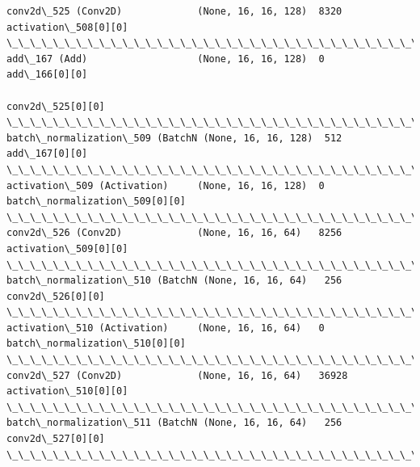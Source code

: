 \documentclass[11pt]{article}
\begin{document}
\begin{Verbatim}[commandchars=\\\{\}]
conv2d\_525 (Conv2D)             (None, 16, 16, 128)  8320        activation\_508[0][0]             
\_\_\_\_\_\_\_\_\_\_\_\_\_\_\_\_\_\_\_\_\_\_\_\_\_\_\_\_\_\_\_\_\_\_\_\_\_\_\_\_\_\_\_\_\_\_\_\_\_\_\_\_\_\_\_\_\_\_\_\_\_\_\_\_\_\_\_\_\_\_\_\_\_\_\_\_\_\_\_\_\_\_\_\_\_\_\_\_\_\_\_\_\_\_\_\_\_\_
add\_167 (Add)                   (None, 16, 16, 128)  0           add\_166[0][0]                    
                                                                 conv2d\_525[0][0]                 
\_\_\_\_\_\_\_\_\_\_\_\_\_\_\_\_\_\_\_\_\_\_\_\_\_\_\_\_\_\_\_\_\_\_\_\_\_\_\_\_\_\_\_\_\_\_\_\_\_\_\_\_\_\_\_\_\_\_\_\_\_\_\_\_\_\_\_\_\_\_\_\_\_\_\_\_\_\_\_\_\_\_\_\_\_\_\_\_\_\_\_\_\_\_\_\_\_\_
batch\_normalization\_509 (BatchN (None, 16, 16, 128)  512         add\_167[0][0]                    
\_\_\_\_\_\_\_\_\_\_\_\_\_\_\_\_\_\_\_\_\_\_\_\_\_\_\_\_\_\_\_\_\_\_\_\_\_\_\_\_\_\_\_\_\_\_\_\_\_\_\_\_\_\_\_\_\_\_\_\_\_\_\_\_\_\_\_\_\_\_\_\_\_\_\_\_\_\_\_\_\_\_\_\_\_\_\_\_\_\_\_\_\_\_\_\_\_\_
activation\_509 (Activation)     (None, 16, 16, 128)  0           batch\_normalization\_509[0][0]    
\_\_\_\_\_\_\_\_\_\_\_\_\_\_\_\_\_\_\_\_\_\_\_\_\_\_\_\_\_\_\_\_\_\_\_\_\_\_\_\_\_\_\_\_\_\_\_\_\_\_\_\_\_\_\_\_\_\_\_\_\_\_\_\_\_\_\_\_\_\_\_\_\_\_\_\_\_\_\_\_\_\_\_\_\_\_\_\_\_\_\_\_\_\_\_\_\_\_
conv2d\_526 (Conv2D)             (None, 16, 16, 64)   8256        activation\_509[0][0]             
\_\_\_\_\_\_\_\_\_\_\_\_\_\_\_\_\_\_\_\_\_\_\_\_\_\_\_\_\_\_\_\_\_\_\_\_\_\_\_\_\_\_\_\_\_\_\_\_\_\_\_\_\_\_\_\_\_\_\_\_\_\_\_\_\_\_\_\_\_\_\_\_\_\_\_\_\_\_\_\_\_\_\_\_\_\_\_\_\_\_\_\_\_\_\_\_\_\_
batch\_normalization\_510 (BatchN (None, 16, 16, 64)   256         conv2d\_526[0][0]                 
\_\_\_\_\_\_\_\_\_\_\_\_\_\_\_\_\_\_\_\_\_\_\_\_\_\_\_\_\_\_\_\_\_\_\_\_\_\_\_\_\_\_\_\_\_\_\_\_\_\_\_\_\_\_\_\_\_\_\_\_\_\_\_\_\_\_\_\_\_\_\_\_\_\_\_\_\_\_\_\_\_\_\_\_\_\_\_\_\_\_\_\_\_\_\_\_\_\_
activation\_510 (Activation)     (None, 16, 16, 64)   0           batch\_normalization\_510[0][0]    
\_\_\_\_\_\_\_\_\_\_\_\_\_\_\_\_\_\_\_\_\_\_\_\_\_\_\_\_\_\_\_\_\_\_\_\_\_\_\_\_\_\_\_\_\_\_\_\_\_\_\_\_\_\_\_\_\_\_\_\_\_\_\_\_\_\_\_\_\_\_\_\_\_\_\_\_\_\_\_\_\_\_\_\_\_\_\_\_\_\_\_\_\_\_\_\_\_\_
conv2d\_527 (Conv2D)             (None, 16, 16, 64)   36928       activation\_510[0][0]             
\_\_\_\_\_\_\_\_\_\_\_\_\_\_\_\_\_\_\_\_\_\_\_\_\_\_\_\_\_\_\_\_\_\_\_\_\_\_\_\_\_\_\_\_\_\_\_\_\_\_\_\_\_\_\_\_\_\_\_\_\_\_\_\_\_\_\_\_\_\_\_\_\_\_\_\_\_\_\_\_\_\_\_\_\_\_\_\_\_\_\_\_\_\_\_\_\_\_
batch\_normalization\_511 (BatchN (None, 16, 16, 64)   256         conv2d\_527[0][0]                 
\_\_\_\_\_\_\_\_\_\_\_\_\_\_\_\_\_\_\_\_\_\_\_\_\_\_\_\_\_\_\_\_\_\_\_\_\_\_\_\_\_\_\_\_\_\_\_\_\_\_\_\_\_\_\_\_\_\_\_\_\_\_\_\_\_\_\_\_\_\_\_\_\_\_\_\_\_\_\_\_\_\_\_\_\_\_\_\_\_\_\_\_\_\_\_\_\_\_

\end{Verbatim}
\end{document}
